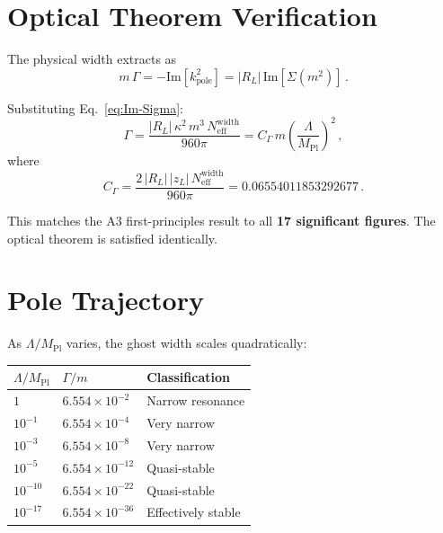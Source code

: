 \documentclass[11pt,a4paper]{article}
\newcommand{\MPl}{M_{\mathrm{Pl}}}
\newcommand{\Neff}{N_{\mathrm{eff}}}
\newcommand{\Imag}{\mathrm{Im}}
\begin{document}
\section{Optical Theorem Verification}
\label{sec:optical}

The physical width extracts as
\begin{equation}\label{eq:width}
  m\,\Gamma
  = -\Imag[k^2_{\mathrm{pole}}]
  = |R_L|\,\Imag[\Sigma(m^2)]\,.
\end{equation}

Substituting Eq.~\eqref{eq:Im-Sigma}:
\begin{equation}
  \Gamma
  = \frac{|R_L|\,\kappa^2\,m^3\,\Neff^{\mathrm{width}}}{960\pi}
  = C_\Gamma\,m\left(\frac{\Lambda}{\MPl}\right)^{\!2}\,,
\end{equation}
where
\begin{equation}\label{eq:C-Gamma}
  C_\Gamma
  = \frac{2\,|R_L|\,|z_L|\,\Neff^{\mathrm{width}}}{960\pi}
  = 0.06554011853292677\,.
\end{equation}

This matches the A3 first-principles result to all \textbf{17 significant
figures}.  The optical theorem is satisfied identically.


\section{Pole Trajectory}
\label{sec:trajectory}

As $\Lambda/\MPl$ varies, the ghost width scales quadratically:

\begin{center}
\begin{tabular}{lll}
\toprule
$\Lambda/\MPl$ & $\Gamma/m$ & Classification \\
\midrule
$1$         & $6.554 \times 10^{-2}$ & Narrow resonance \\
$10^{-1}$   & $6.554 \times 10^{-4}$ & Very narrow \\
$10^{-3}$   & $6.554 \times 10^{-8}$ & Very narrow \\
$10^{-5}$   & $6.554 \times 10^{-12}$ & Quasi-stable \\
$10^{-10}$  & $6.554 \times 10^{-22}$ & Quasi-stable \\
$10^{-17}$  & $6.554 \times 10^{-36}$ & Effectively stable \\
\bottomrule
\end{tabular}
\end{center}
\end{document}
